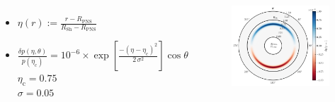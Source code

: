 \documentclass{beamer}
\newcommand{\rpns}{R_{\mathrm{PNS}}}
\newcommand{\rsh}{R_{\mathrm{Sh}}}
\begin{document}
\begin{frame}

  \begin{columns}[c]


      \begin{itemize}[<+->]
        \item[]
          $\eta\left(r\right):=\frac{r-\rpns}{\rsh-\rpns}$ \\[1em]
        \item[]
          $\frac{\delta p\left(\eta,\theta\right)}
                {p\left(\eta_{\mathrm{c}}\right)}
          =10^{-6}\times
           \exp\left[\frac{-\left(\eta-\eta_{\mathrm{c}}\right)^{2}}
                          {2\,\sigma^{2}}\right]
           \cos\theta$ \\ [1em]
          $\eta_{\mathrm{c}}=0.75$ \\ [1em]
          $\sigma=0.05$
      \end{itemize}


      \begin{figure}[htb!]
        \centering
        \includegraphics[width=\textwidth]{fig.pert.png}
      \end{figure}

  \end{columns}

\end{frame}
\end{document}
